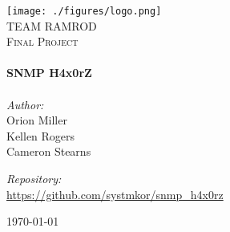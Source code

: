 

\begin{titlepage}
\begin{center}

\texttt{[image: ./figures/logo.png]}
\\[1cm]

\textsc{\LARGE TEAM RAMROD}\\[1.5cm]

\textsc{\Large Final Project}\\[0.5cm]

\HRule \\[0.4cm]
{\Huge \bfseries SNMP H4x0rZ}\\[0.4cm]
\HRule \\[1.5cm]

{\large
 \emph{Author:}\\
 Orion Miller\\
 Kellen Rogers\\
 Cameron Stearns\\
}

\vfill{}

{\large
 \emph{Repository:}\\
 \url{https://github.com/systmkor/snmp_h4x0rz}
}

\vfill

{\large \today}

\end{center}
\end{titlepage}
